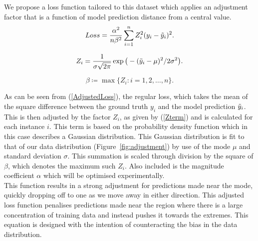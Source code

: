\noindent
We propose a loss function tailored to this dataset which applies an adjustment factor that is a function of model prediction distance from a central value.
\\

\begin{equation}
	Loss = \frac{\alpha^{2}}{n\beta^{2}} \sum_{i=1}^{n} Z_i^{2}(y_i - \Tilde{y}_i)^2.
	\label{AdjustedLoss}
\end{equation}

\begin{equation}
	Z_i =\frac{1}{\sigma \sqrt{2\pi}} \exp\big(-(\Tilde{y}_i - \mu)^{2}/2\sigma^2\big).
	\label{Zterm}
\end{equation}

\begin{equation}
	\beta \coloneqq \max\{Z_{i}: i=1, 2, \ldots, n\}.
	\label{b}
\end{equation}

\noindent
As can be seen from (\ref{AdjustedLoss}), the regular loss, which takes the mean of the square difference between the ground truth $y_i$ and the model prediction $\Tilde{y}_i$. This is then adjusted by the factor $Z_i$, as given by (\ref{Zterm}) and is calculated for each instance $i$. This term is based on the probability density function which in this case describes a Gaussian distribution. This Gaussian distribution is fit to that of our data distribution (Figure~\ref{fig:adjustment}) by use of the mode $\mu$ and standard deviation $\sigma$. This summation is scaled through division by the square of $\beta$, which denotes the maximum such $Z_i$. Also included is the magnitude coefficient $\alpha$ which will be optimised experimentally.
\\

\noindent
This function results in a strong adjustment for predictions made near the mode, quickly dropping off to one as we move away in either direction. This adjusted loss function penalises predictions made near the region where there is a large concentration of training data and instead pushes it towards the extremes. This equation is designed with the intention of counteracting the bias in the data distribution.


